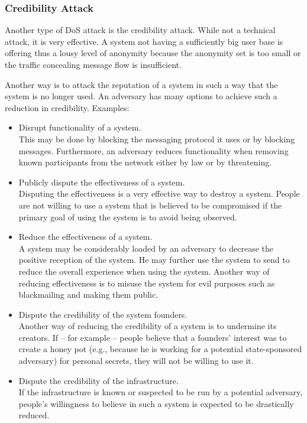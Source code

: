 \subsubsection{Credibility Attack}
Another type of DoS attack is the credibility attack. While not a technical attack, it is very effective. A system not having a sufficiently big user base is offering thus a lousy level of anonymity because the anonymity set is too small or the traffic concealing message flow is insufficient. 

Another way is to attack the reputation of a system in such a way that the system is no longer used. An adversary has many options to achieve such a reduction in credibility. Examples:
\begin{itemize}
	\item Disrupt functionality of a system.\\ 
	This may be done by blocking the messaging protocol it uses or by blocking messages. Furthermore, an adversary reduces functionality when removing known participants from the network either by law or by threatening.
	\item Publicly dispute the effectiveness of a system.\\
	Disputing the effectiveness is a very effective way to destroy a system. People are not willing to use a system that is believed to be compromised if the primary goal of using the system is to avoid being observed.
	\item Reduce the effectiveness of a system.\\
	A system may be considerably loaded by an adversary to decrease the positive reception of the system. He may further use the system to send  to reduce the overall experience when using the system. Another way of reducing effectiveness is to misuse the system for evil purposes such as blackmailing and making them public.
	\item Dispute the credibility of the system founders.\\
	Another way of reducing the credibility of a system is to undermine its creators. If -- for example -- people believe that a founders' interest was to create a honey pot (e.g., because he is working for a potential state-sponsored adversary) for personal secrets, they will not be willing to use it.
	\item Dispute the credibility of the infrastructure.\\
	If the infrastructure is known or suspected to be run by a potential adversary, people's willingness to believe in such a system is expected to be drastically reduced.
\end{itemize}

